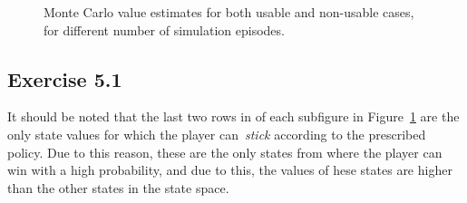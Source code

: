 \documentclass[10pt]{article}
\begin{document}
\begin{figure}[H]
\begin{subfigure}{0.45\textwidth}
 		\end{subfigure}
 		\begin{subfigure}{0.45\textwidth}
 		\end{subfigure}
 		\begin{subfigure}{0.45\textwidth}
 		\end{subfigure}
 		\caption{Monte Carlo value estimates for both usable and non-usable cases, for different number of simulation episodes.}
 		\label{fig:ex_5_1}
 	\end{figure}
 	\subsection*{Exercise 5.1}
 	\label{ss:5.1}
 	It should be noted that the last two rows in of each subfigure in Figure~\ref{fig:ex_5_1} are the only state values for which the player can~\emph{stick} according to the prescribed policy. Due to this reason, these are the only states from where the player can win with a high probability, and due to this, the values of hese states are higher than the other states in the state space.
\end{document}
